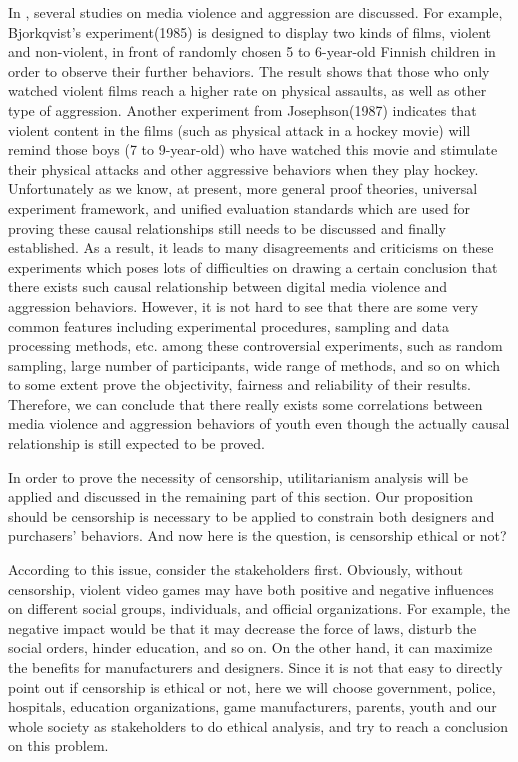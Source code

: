  In \cite{anderson2003}, several studies on media violence and aggression are discussed. For example, Bjorkqvist's experiment(1985)   is designed to display two kinds of films, violent and non-violent, in front of randomly chosen 5 to 6-year-old Finnish children in order to observe their further behaviors. The result shows that those who only watched violent films reach a higher rate on physical assaults, as well as other type of aggression. Another experiment from Josephson(1987)  indicates that violent content in the films (such as physical attack in a hockey movie) will remind those boys (7 to 9-year-old) who have watched this movie and stimulate their physical attacks and other aggressive behaviors when they play hockey. Unfortunately as we know, at present, more general proof theories, universal experiment framework, and unified evaluation standards which are used for proving these causal relationships still needs to be discussed and finally established. As a result, it leads to many disagreements and criticisms on these experiments which poses lots of difficulties on drawing a certain conclusion that there exists such causal relationship between digital media violence and aggression behaviors. However, it is not hard to see that there are some very common features including experimental procedures, sampling and data processing methods, etc. among these controversial experiments, such as random sampling, large number of participants, wide range of methods, and so on which to some extent prove the objectivity, fairness and reliability of their results. Therefore, we can conclude that there really exists some correlations between media violence and aggression behaviors of youth even though the actually causal relationship is still expected to be proved. 

In order to prove the necessity of censorship, utilitarianism analysis will be applied and discussed in the remaining part of this section. Our proposition should be censorship is necessary to be applied to constrain both designers and purchasers' behaviors. And now here is the question, is censorship ethical or not? 

According to this issue, consider the stakeholders first. Obviously, without censorship, violent video games may have both positive and negative influences on different social groups, individuals, and official organizations. For example, the negative impact would be that it may decrease the force of laws, disturb the social orders, hinder education, and so on. On the other hand, it can maximize the benefits for manufacturers and designers. Since it is not that easy to directly point out if censorship is ethical or not, here we will choose government, police, hospitals, education organizations, game manufacturers, parents, youth and our whole society as stakeholders to do ethical analysis, and try to reach a conclusion on this problem.

